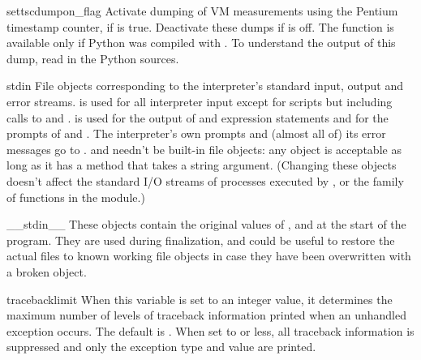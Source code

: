\begin{funcdesc}{settscdump}{on_flag}
  Activate dumping of VM measurements using the Pentium timestamp
  counter, if  is true. Deactivate these dumps if
   is off. The function is available only if Python
  was compiled with . To understand the
  output of this dump, read  in the Python
  sources.
\end{funcdesc}

\begin{datadesc}{stdin}
  File objects corresponding to the interpreter's standard input,
  output and error streams.   is used for all interpreter
  input except for scripts but including calls to
   and
  .   is
  used for the output of  and expression statements and
  for the prompts of  and .
  The interpreter's own prompts and (almost all of) its error messages
  go to .   and  needn't be
  built-in file objects: any object is acceptable as long as it has a
   method that takes a string argument.  (Changing
  these objects doesn't affect the standard I/O streams of processes
  executed by ,  or the
   family of functions in the 
  module.)
\end{datadesc}

\begin{datadesc}{__stdin__}
  These objects contain the original values of ,
   and  at the start of the program.  They
  are used during finalization, and could be useful to restore the
  actual files to known working file objects in case they have been
  overwritten with a broken object.
\end{datadesc}

\begin{datadesc}{tracebacklimit}
  When this variable is set to an integer value, it determines the
  maximum number of levels of traceback information printed when an
  unhandled exception occurs.  The default is .  When set
  to  or less, all traceback information is suppressed and
  only the exception type and value are printed.
\end{datadesc}


